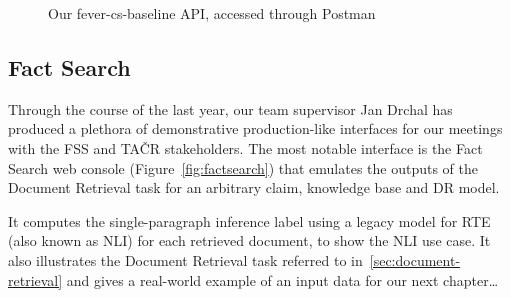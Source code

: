 \begin{figure}[H]
\vspace{2em}
\caption{Our \textsf{fever-cs-baseline} \textsf{API}, accessed through \textsf{Postman}}
\label{fig:rys}
\end{figure}

\subsection{Fact Search}


Through the course of the last year, our team supervisor Jan Drchal has produced a plethora of demonstrative production-like interfaces for our meetings with the \textsf{FSS} and \textsf{TAČR} stakeholders. The most notable interface is the \textsf{Fact Search} web console (Figure~\ref{fig:factsearch}) that emulates the outputs of the Document Retrieval task for an arbitrary claim, knowledge base and DR model.  

It computes the single-paragraph inference label using a legacy model for RTE (also known as NLI) for each retrieved document, to show the NLI use case. It also illustrates the Document Retrieval task referred to in~\ref{sec:document-retrieval} and gives a real-world example of an input data for our next chapter\dots

